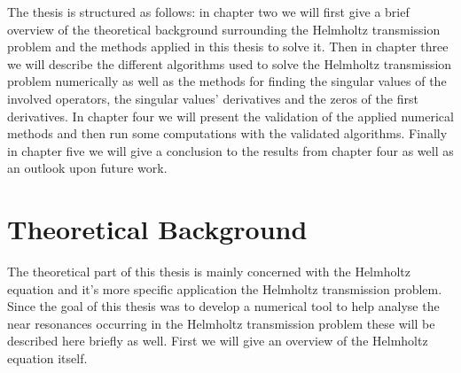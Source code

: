 \documentclass[a4paper, oneside]{thirdparty_stylesheets/discothesis}
\begin{document}
The thesis is structured as follows: in chapter two we will first give a brief overview of the theoretical background surrounding the Helmholtz transmission problem and the methods applied in this thesis to solve it.
Then in chapter three we will describe the different algorithms used to solve the Helmholtz transmission problem numerically as well as the methods for finding the singular values of the involved operators, the singular values' derivatives and the zeros of the first derivatives.
In chapter four we will present the validation of the applied numerical methods and then run some computations with the validated algorithms. 
Finally in chapter five we will give a conclusion to the results from chapter four as well as an outlook upon future work.


\chapter{Theoretical Background}
The theoretical part of this thesis is mainly concerned with the Helmholtz equation and it's more specific application the Helmholtz transmission problem.
Since the goal of this thesis was to develop a numerical tool to help analyse the near resonances occurring in the Helmholtz transmission problem these will be described here briefly as well.
First we will give an overview of the Helmholtz equation itself.
\end{document}
